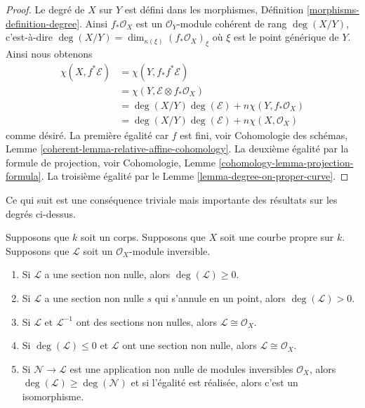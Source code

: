 \begin{proof}
Le degré de $X$ sur $Y$ est défini dans les
morphismes, Définition
\ref{morphisms-definition-degree}. Ainsi $f_*\mathcal{O}_X$
est un $\mathcal{O}_Y$-module cohérent de rang $\deg(X/Y)$,
c’est-à-dire $\deg(X/Y) = \dim_{\kappa(\xi)}
(f_*\mathcal{O}_X)_\xi$ où $\xi$ est le point générique de $Y$. Ainsi nous obtenons
\begin{align*}
\chi(X, f^*\mathcal{E})
& =
\chi(Y, f_*f^*\mathcal{E}) \\
& =
\chi(Y, \mathcal{E} \otimes f_*\mathcal{O}_X) \\
& =
\deg(X/Y) \deg(\mathcal{E}) + n \chi(Y, f_*\mathcal{O}_X) \\
& =
\deg(X/Y) \deg(\mathcal{E}) + n \chi(X, \mathcal{O}_X)
\end{align*}
comme désiré. La première égalité car $f$ est fini, voir
Cohomologie des schémas, Lemme
\ref{coherent-lemma-relative-affine-cohomology}. La deuxième égalité par la
formule de projection, voir Cohomologie, Lemme
\ref{cohomology-lemma-projection-formula}. La troisième égalité par le Lemme \ref{lemma-degree-on-proper-curve}.
\end{proof}

\noindent
Ce qui suit est une conséquence triviale mais
importante des résultats sur les degrés ci-dessus.

\begin{lemma}
\label{lemma-check-invertible-sheaf-trivial}
Supposons que $k$ soit un corps. Supposons que $X$ soit une courbe propre sur
$k$. Supposons que $\mathcal{L}$ soit un $\mathcal{O}_X$-module inversible.
\begin{enumerate}
\item Si $\mathcal{L}$ a une section non nulle, alors
$\deg(\mathcal{L}) \geq 0$. \item Si $\mathcal{L}$ a une
section non nulle $s$ qui s'annule en un point, alors
$\deg(\mathcal{L}) > 0$. \item Si $\mathcal{L}$ et
$\mathcal{L}^{-1}$ ont des sections non nulles, alors
$\mathcal{L} \cong \mathcal{O}_X$. \item Si $\deg(\mathcal{L})
\leq 0$ et $\mathcal{L}$ ont une section non nulle, alors
$\mathcal{L} \cong \mathcal{O}_X$. \item Si $\mathcal{N} \to
\mathcal{L}$ est une application non nulle de modules
inversibles $\mathcal{O}_X$, alors $\deg(\mathcal{L}) \geq
\deg(\mathcal{N})$ et si l'égalité est réalisée, alors c'est un isomorphisme.
\end{enumerate}
\end{lemma}

